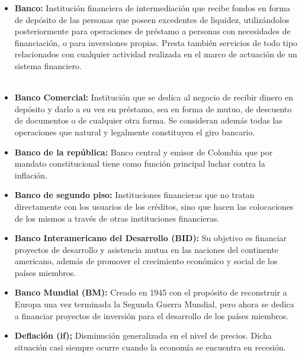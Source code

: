 \begin{itemize}

\item \textbf{Banco: }
Institución financiera de intermediación que recibe fondos en forma de depósito de las personas que poseen excedentes de liquidez, utilizándolos posteriormente para operaciones de préstamo a personas con necesidades de financiación, o para inversiones propias. Presta también servicios de todo tipo relacionados con cualquier actividad realizada en el marco de actuación de un sistema financiero.\\ \\

\item \textbf{Banco Comercial: }
Institución que se dedica al negocio de recibir dinero en depósito y darlo a su vez en préstamo, sea en forma de mutuo, de descuento de documentos o de cualquier otra forma. Se consideran además todas las operaciones que natural y legalmente constituyen el giro bancario.\\

\item \textbf{Banco de la república: }
Banco central y emisor de Colombia que por mandato constitucional tiene como función principal luchar contra la inflación.\\

\item \textbf{Banco de segundo piso:} Instituciones financieras que no tratan directamente con los usuarios de los créditos, sino que hacen las colocaciones de los mismos a través de otras instituciones financieras.\\

\item \textbf{Banco Interamericano del Desarrollo (BID): }
Su objetivo es financiar proyectos de desarrollo y asistencia mutua en las naciones del continente americano, además de promover el crecimiento económico y social de los países miembros.\\

\item \textbf{Banco Mundial (BM): }
Creado en 1945 con el propósito de reconstruir a Europa una vez terminada la Segunda Guerra Mundial, pero ahora se dedica a financiar proyectos de inversión para el desarrollo de los países miembros.\\

\item {\textbf{Deflación (if); }}
Disminución generalizada en el nivel de precios. Dicha situación casi siempre ocurre cuando la economía se encuentra en recesión.\\


\end{itemize}
